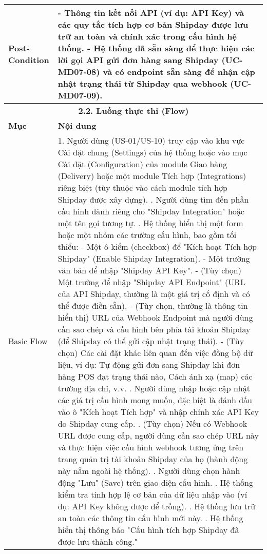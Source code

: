 \begin{longtable}{|m{4cm}|p{11cm}|}
\hline
Post-Condition & - Thông tin kết nối API (ví dụ: API Key) và các quy tắc tích hợp cơ bản Shipday được lưu trữ an toàn và chính xác trong cấu hình hệ thống. \newline - Hệ thống đã sẵn sàng để thực hiện các lời gọi API gửi đơn hàng sang Shipday (UC-MD07-08) và có endpoint sẵn sàng để nhận cập nhật trạng thái từ Shipday qua webhook (UC-MD07-09). \\
\hline
\multicolumn{2}{|c|}{\textbf{2.2. Luồng thực thi (Flow)}} \\
\hline
\textbf{Mục} & \textbf{Nội dung} \\
\hline
Basic Flow & 1. Người dùng (US-01/US-10) truy cập vào khu vực Cài đặt chung (Settings) của hệ thống hoặc vào mục Cài đặt (Configuration) của module Giao hàng (Delivery) hoặc một module Tích hợp (Integrations) riêng biệt (tùy thuộc vào cách module tích hợp Shipday được xây dựng). \newline 2. Người dùng tìm đến phần cấu hình dành riêng cho "Shipday Integration" hoặc một tên gọi tương tự. \newline 3. Hệ thống hiển thị một form hoặc một nhóm các trường cấu hình, bao gồm tối thiểu: \newline    - Một ô kiểm (checkbox) để "Kích hoạt Tích hợp Shipday" (Enable Shipday Integration). \newline    - Một trường văn bản để nhập "Shipday API Key". \newline    - (Tùy chọn) Một trường để nhập "Shipday API Endpoint" (URL của API Shipday, thường là một giá trị cố định và có thể được điền sẵn). \newline    - (Tùy chọn, thường là thông tin hiển thị) URL của Webhook Endpoint mà người dùng cần sao chép và cấu hình bên phía tài khoản Shipday (để Shipday có thể gửi cập nhật trạng thái). \newline    - (Tùy chọn) Các cài đặt khác liên quan đến việc đồng bộ dữ liệu, ví dụ: Tự động gửi đơn sang Shipday khi đơn hàng POS đạt trạng thái nào, Cách ánh xạ (map) các trường địa chỉ, v.v. \newline 4. Người dùng nhập hoặc cập nhật các giá trị cấu hình mong muốn, đặc biệt là đánh dấu vào ô "Kích hoạt Tích hợp" và nhập chính xác API Key do Shipday cung cấp. \newline 5. (Tùy chọn) Nếu có Webhook URL được cung cấp, người dùng cần sao chép URL này và thực hiện việc cấu hình webhook tương ứng trên trang quản trị tài khoản Shipday của họ (hành động này nằm ngoài hệ thống). \newline 6. Người dùng chọn hành động "Lưu" (Save) trên giao diện cấu hình. \newline 7. Hệ thống kiểm tra tính hợp lệ cơ bản của dữ liệu nhập vào (ví dụ: API Key không được để trống). \newline 8. Hệ thống lưu trữ an toàn các thông tin cấu hình mới này. \newline 9. Hệ thống hiển thị thông báo "Cấu hình tích hợp Shipday đã được lưu thành công." \\

\end{longtable}
